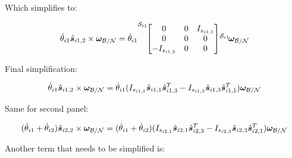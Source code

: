 \documentclass[paper]{aiaaNew}
\begin{document}
Which simplifies to:

\begin{equation}
[I_{\text{sp}_{i1},S_{c,i1}}] \dot{\theta}_{i1} \hat{\bm s}_{i1,2} \times \bm \omega_{\cal{B/N}} = \dot{\theta}_{i1} {\vphantom{\begin{bmatrix}
		I_{s_{i1,1}} & 0 & 0 \\
		0 & I_{s_{i1,2}} & 0 \\
		0 & 0 & I_{s_{i1,3}}
		\end{bmatrix}}}^{\mathcal{S}_{i1}\!}{\begin{bmatrix}
	0 & 0 & I_{s_{i1,1}} \\
	0 & 0 & 0 \\
	-I_{s_{i1,3}} & 0 & 0
	\end{bmatrix}} {\vphantom{\bm \omega_{\cal{B/N}}}}^{\mathcal{S}_{i1}\!}{\bm \omega_{\cal{B/N}}} 
\end{equation}

Final simplification:

\begin{equation}
[I_{\text{sp}_{i1},S_{c,i1}}] \dot{\theta}_{i1} \hat{\bm s}_{i1,2} \times \bm \omega_{\cal{B/N}} = \dot{\theta}_{i1} (I_{s_{i1,1}} \hat{\bm s}_{i1,1} \hat{\bm s}_{i1,3}^T - I_{s_{i1,3}} \hat{\bm s}_{i1,3} \hat{\bm s}_{i1,1}^T) \bm \omega_{\cal{B/N}}
\end{equation}

Same for second panel:

\begin{equation}
[I_{\text{sp}_{i2},S_{c,i2}}] (\dot{\theta}_{i1}  + \dot{\theta}_{i2})  \hat{\bm s}_{i2,2} \times \bm \omega_{\cal{B/N}} = (\dot{\theta}_{i1}  + \dot{\theta}_{i2}) (I_{s_{i2,1}} \hat{\bm s}_{i2,1} \hat{\bm s}_{i2,3}^T - I_{s_{i2,3}} \hat{\bm s}_{i2,3} \hat{\bm s}_{i2,1}^T) \bm \omega_{\cal{B/N}}
\end{equation}

Another term that needs to be simplified is:
\end{document}
